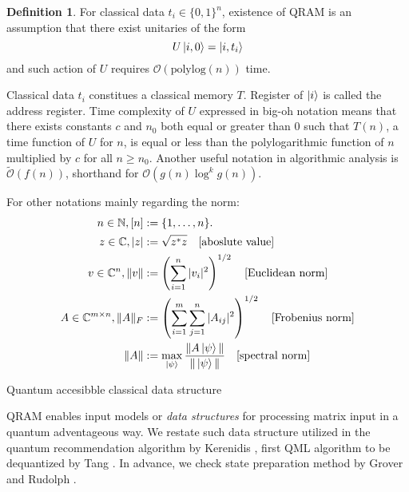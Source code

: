 \documentclass[10pt,twoside,reqno]{amsart} %
\makeatletter
\renewcommand{\section}{\@startsection{section}{1}
   \z@{.7\linespacing\@plus\linespacing}{.5\linespacing}
   {\normalfont\upshape\bfseries\centering}}
\theoremstyle{plain}
\theoremstyle{definition}
\newtheorem{defn}[thm]{Definition}
\makeatother
\begin{document}
\begin{defn}
  For classical data $t_i\in\{0,1\}^n$, existence of QRAM is an assumption
  that there exist unitaries of the form
  \[
    U\ket{i,0}=\ket{i,t_i}
  \]
  and such action of $U$ requires $\mathcal{O}(\textrm{polylog}(n))$ time.
\end{defn}

Classical data $t_i$ constitues a classical memory $T$. Register of $\ket{i}$
is called the address register. Time complexity of $U$ expressed in big-oh
notation means that there exists constants $c$ and $n_0$ both equal or greater
than $0$ such that $T(n)$, a time function of $U$ for $n$, is equal or less than
the polylogarithmic function of $n$ multiplied by $c$ for all $n\geq n_0$.
Another useful notation in algorithmic analysis is 
$\widetilde{\mathcal{O}}(f(n))$, shorthand for $\mathcal{O}(g(n)\log^k g(n))$.

For other notations mainly regarding the norm:
\begin{align*}
  n\in\mathbb{N}, [n]&:=\{1,\ldots,n\}. \\
  z\in\mathbb{C}, |z|&:=\sqrt{z^*z}\quad\textrm{[aboslute value]} \\
  v\in\mathbb{C}^n, \|v\| &:= \left(\sum_{i=1}^n|v_i|^2\right)^{1/2}
  \quad\textrm{[Euclidean norm]}\\
  A\in\mathbb{C}^{m\times n}, \|A\|_F&
  :=\left(\sum_{i=1}^m\sum_{j=1}^n|A_{ij}|^2\right)^{1/2}
  \quad\textrm{[Frobenius norm]}\\
  \|A\|&:=\max_{\ket{\psi}}
  \frac{\|A\ket{\psi}\|}{\|\ket{\psi}\|}
  \quad\textrm{[spectral norm]}
\end{align*}

\section{Quantum accesibble classical data structure}

QRAM enables input models or \emph{data structures} for processing matrix
input in a quantum adventageous way. We restate such data structure utilized
in the quantum recommendation algorithm by Kerenidis \cite{kerenidis2017},
first QML algorithm to be dequantized by Tang \cite{tang2019}. In advance,
we check state preparation method by Grover and Rudolph \cite{grover2002}.
\end{document}
